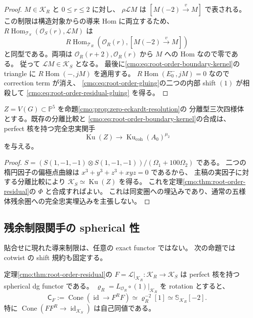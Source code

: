 \begin{proof}
$M\in\mathcal K_R$ と $0\le r\le2$ に対し、
$\rho\mathcal L M$ は
$[M(-2)\xrightarrow{v}M]$ で表される。
この制限は構造対象からの導来 Hom に両立するため、
$R\operatorname{Hom}_{\mathcal T_S}(\mathcal O_S(r),\mathcal L M)$ は
\[
 R\operatorname{Hom}_{\mathcal T_R}
     (\mathcal O_R(r),[M(-2)\xrightarrow{v}M])
\]
と同型である。両項は $\mathcal O_R(r+2),\mathcal O_R(r)$ から $M$ への Hom なので零である。
従って $\mathcal L M\in\mathcal K_S$ となる。
最後に\eqref{cmo:eq:root-order-boundary-kernel}の triangle に
$R\operatorname{Hom}(-,jM)$ を適用する。
$R\operatorname{Hom}(E_0^-,jM)=0$ なので correction term が消え、
\eqref{cmo:eq:root-order-gluing}の二つの内部 shift $(1)$ が相殺して
\eqref{cmo:eq:root-order-residual-gluing} を得る。
\end{proof}

\begin{corollary}[可換四様体成分からの実関手]
\label{cmo:cor:commutative-boundary-embedding}
$Z=V(G)\subset\mathbb P^5$ を命題\ref{cmo:prop:zero-eckardt-resolution}の
分離型三次四様体とする。既存の分離比較と
\eqref{cmo:eq:root-order-boundary-kernel}の合成は、
perfect 核を持つ完全忠実関手
\[
 \operatorname{Ku}(Z)\longrightarrow
       \operatorname{Ku}_{\mathrm{coh}}(A_0)^{\mu_2}
\]
を与える。
\end{corollary}
\begin{proof}
$S=(S(1,-1,-1)\otimes S(1,-1,-1))/(\Omega_1+100\Omega_2)$ である。
二つの楕円因子の偏極点曲線は
$x^3+y^3+z^3+xyz=0$ であるから、
主稿の実因子に対する分離比較により
$\mathcal K_S\simeq\operatorname{Ku}(Z)$ を得る。
これを定理\ref{cmo:thm:root-order-residual}の $\Phi$ と合成すればよい。
これは同変圏への埋込みであり、通常の五様体残余圏への完全忠実埋込みを主張しない。
\end{proof}

\subsection{残余制限関手の spherical 性}

貼合せに現れた導来制限は、任意の exact functor ではない。
次の命題では cotwist の shift 規約も固定する。

\begin{proposition}
\label{cmo:prop:invariant-restriction-spherical}
定理\ref{cmo:thm:root-order-residual}の
$F=\mathcal L|_{\mathcal K_R}:\mathcal K_R\to\mathcal K_S$ は
perfect 核を持つ spherical dg functor である。
$\varrho_R=L_{\mathcal O_R}\circ(1)|_{\mathcal K_R}$ を rotation とすると、
\begin{equation}
\label{cmo:eq:invariant-restriction-cotwist}
 \mathsf C_F:=\operatorname{Cone}(\operatorname{id}\longrightarrow F^RF)
 \simeq\varrho_R^{-2}[1]
 \simeq\mathbb S_{\mathcal K_R}[-2].
\end{equation}
特に $\operatorname{Cone}(FF^R\to\operatorname{id}_{\mathcal K_S})$ は自己同値である。
\end{proposition}

